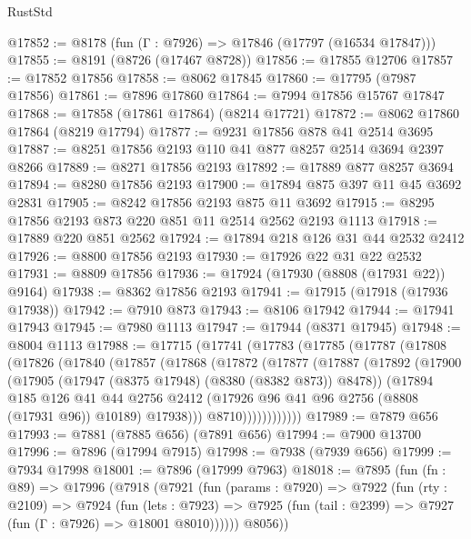 \begin{lexlean}{RustStd}
\begin{coremodule}
@17852 := @8178 (fun (Γ : @7926) => @17846 (@17797 (@16534 @17847)))
@17855 := @8191 (@8726 (@17467 @8728))
@17856 := @17855 @12706
@17857 := @17852 @17856
@17858 := @8062 @17845
@17860 := @17795 (@7987 @17856)
@17861 := @7896 @17860
@17864 := @7994 @17856 @15767 @17847
@17868 := @17858 (@17861 @17864) (@8214 @17721)
@17872 := @8062 @17860 @17864 (@8219 @17794)
@17877 := @9231 @17856 @878 @41 @2514 @3695
@17887 := @8251 @17856 @2193 @110 @41 @877 @8257 @2514 @3694 @2397 @8266
@17889 := @8271 @17856 @2193
@17892 := @17889 @877 @8257 @3694
@17894 := @8280 @17856 @2193
@17900 := @17894 @875 @397 @11 @45 @3692 @2831
@17905 := @8242 @17856 @2193 @875 @11 @3692
@17915 := @8295 @17856 @2193 @873 @220 @851 @11 @2514 @2562 @2193 @1113
@17918 := @17889 @220 @851 @2562
@17924 := @17894 @218 @126 @31 @44 @2532 @2412
@17926 := @8800 @17856 @2193
@17930 := @17926 @22 @31 @22 @2532
@17931 := @8809 @17856
@17936 := @17924 (@17930 (@8808 (@17931 @22)) @9164)
@17938 := @8362 @17856 @2193
@17941 := @17915 (@17918 (@17936 @17938))
@17942 := @7910 @873
@17943 := @8106 @17942
@17944 := @17941 @17943
@17945 := @7980 @1113
@17947 := @17944 (@8371 @17945)
@17948 := @8004 @1113
@17988 := @17715
    (@17741
      (@17783
        (@17785
          (@17787
            (@17808
              (@17826
                (@17840
                  (@17857
                    (@17868
                      (@17872
                        (@17877
                          (@17887
                            (@17892
                              (@17900
                                (@17905 (@17947 (@8375 @17948) (@8380 (@8382 @873)) @8478))
                                (@17894
                                  @185
                                  @126
                                  @41
                                  @44
                                  @2756
                                  @2412
                                  (@17926 @96 @41 @96 @2756 (@8808 (@17931 @96)) @10189)
                                  @17938)))
                            @8710))))))))))))
@17989 := @7879 @656
@17993 := @7881 (@7885 @656) (@7891 @656)
@17994 := @7900 @13700
@17996 := @7896 (@17994 @7915)
@17998 := @7938 (@7939 @656)
@17999 := @7934 @17998
@18001 := @7896 (@17999 @7963)
@18018 := @7895
    (fun (fn : @89) =>
    @17996
      (@7918
        (@7921
          (fun (params : @7920) =>
          @7922
            (fun (rty : @2109) =>
            @7924
              (fun (lets : @7923) =>
              @7925 (fun (tail : @2399) => @7927 (fun (Γ : @7926) => @18001 @8010))))))
        @8056))

\end{coremodule}
\end{lexlean}
